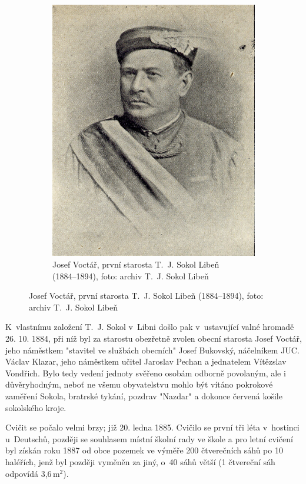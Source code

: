 \documentclass[a5paper, 11pt, twoside]{article}
\begin{document}
\begin{figure}[h]
\begin{subfigure}[c]{0.5\textwidth}
   \includegraphics[width=\textwidth]{img/04_voctar.jpg}
  \caption*{Josef Voctář, první starosta T.~J. Sokol Libeň (1884–⁠⁠⁠⁠⁠⁠1894), foto: archiv T.~J. Sokol Libeň }
  \end{subfigure}
\end{figure}

K~vlastnímu založení T.~J. Sokol v~Libni došlo pak v~ustavující valné hromadě 26. 10. 1884, při níž byl za starostu obezřetně zvolen obecní starosta Josef Voctář, jeho náměstkem "stavitel ve službách obecních" Josef Bukovský, náčelníkem JUC. Václav Klazar, jeho náměstkem učitel Jaroslav Pechan a jednatelem Vítězslav Vondřich. Bylo tedy vedení jednoty svěřeno osobám odborně povolaným, ale i důvěryhodným, neboť ne všemu obyvatelstvu mohlo být vítáno pokrokové zaměření Sokola, bratrské tykání, pozdrav "Nazdar" a dokonce červená košile sokolského kroje.

Cvičit se počalo velmi brzy; již 20. ledna 1885. Cvičilo se první tři léta v~hostinci u~Deutschů, později se souhlasem místní školní rady ve škole a pro letní cvičení byl získán roku 1887 od obce pozemek ve výměře 200 čtverečních sáhů po 10 haléřích, jenž byl později vyměněn za jiný, o~40 sáhů větší (1 čtvereční sáh odpovídá 3,6\,$\textrm{m}^2$).
\end{document}
